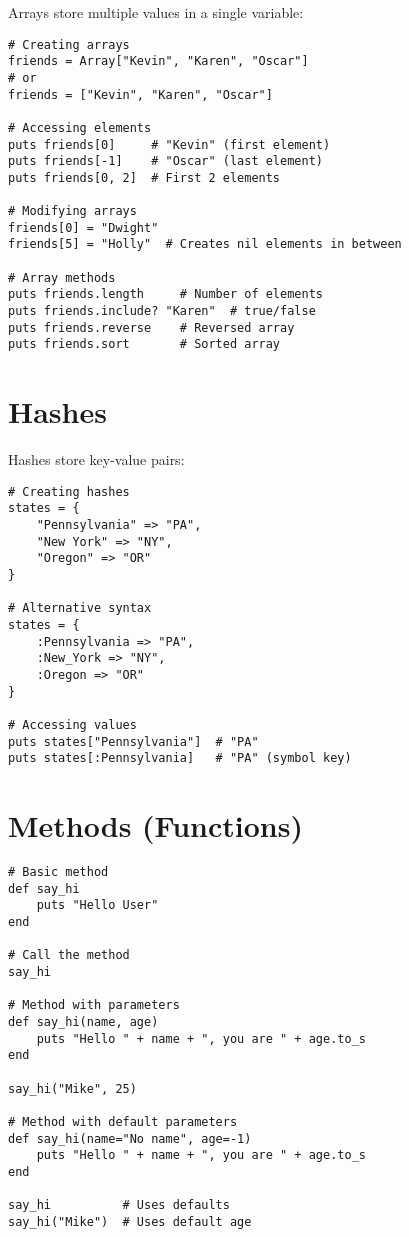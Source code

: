 \documentclass[12pt,a4paper]{article}
\begin{document}
Arrays store multiple values in a single variable:

\begin{lstlisting}
# Creating arrays
friends = Array["Kevin", "Karen", "Oscar"]
# or
friends = ["Kevin", "Karen", "Oscar"]

# Accessing elements
puts friends[0]     # "Kevin" (first element)
puts friends[-1]    # "Oscar" (last element)
puts friends[0, 2]  # First 2 elements

# Modifying arrays
friends[0] = "Dwight"
friends[5] = "Holly"  # Creates nil elements in between

# Array methods
puts friends.length     # Number of elements
puts friends.include? "Karen"  # true/false
puts friends.reverse    # Reversed array
puts friends.sort       # Sorted array
\end{lstlisting}

\section{Hashes}

Hashes store key-value pairs:

\begin{lstlisting}
# Creating hashes
states = {
    "Pennsylvania" => "PA",
    "New York" => "NY",
    "Oregon" => "OR"
}

# Alternative syntax
states = {
    :Pennsylvania => "PA",
    :New_York => "NY",
    :Oregon => "OR"
}

# Accessing values
puts states["Pennsylvania"]  # "PA"
puts states[:Pennsylvania]   # "PA" (symbol key)
\end{lstlisting}

\section{Methods (Functions)}

\begin{lstlisting}
# Basic method
def say_hi
    puts "Hello User"
end

# Call the method
say_hi

# Method with parameters
def say_hi(name, age)
    puts "Hello " + name + ", you are " + age.to_s
end

say_hi("Mike", 25)

# Method with default parameters
def say_hi(name="No name", age=-1)
    puts "Hello " + name + ", you are " + age.to_s
end

say_hi          # Uses defaults
say_hi("Mike")  # Uses default age
\end{lstlisting}
\end{document}
